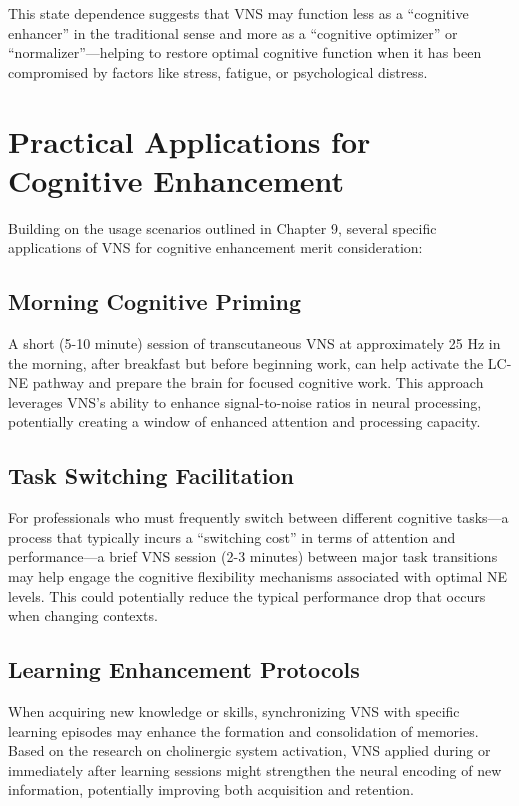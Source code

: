 \documentclass[
  Letterpaper,
]{scrbook}
\begin{document}
This state dependence suggests that VNS may function less as a
``cognitive enhancer'' in the traditional sense and more as a
``cognitive optimizer'' or ``normalizer''---helping to restore optimal
cognitive function when it has been compromised by factors like stress,
fatigue, or psychological distress.

\section{Practical Applications for Cognitive
Enhancement}\label{practical-applications-for-cognitive-enhancement}

Building on the usage scenarios outlined in Chapter 9, several specific
applications of VNS for cognitive enhancement merit consideration:

\subsection{Morning Cognitive Priming}\label{morning-cognitive-priming}

A short (5-10 minute) session of transcutaneous VNS at approximately 25
Hz in the morning, after breakfast but before beginning work, can help
activate the LC-NE pathway and prepare the brain for focused cognitive
work. This approach leverages VNS's ability to enhance signal-to-noise
ratios in neural processing, potentially creating a window of enhanced
attention and processing capacity.

\subsection{Task Switching
Facilitation}\label{task-switching-facilitation}

For professionals who must frequently switch between different cognitive
tasks---a process that typically incurs a ``switching cost'' in terms of
attention and performance---a brief VNS session (2-3 minutes) between
major task transitions may help engage the cognitive flexibility
mechanisms associated with optimal NE levels. This could potentially
reduce the typical performance drop that occurs when changing contexts.

\subsection{Learning Enhancement
Protocols}\label{learning-enhancement-protocols}

When acquiring new knowledge or skills, synchronizing VNS with specific
learning episodes may enhance the formation and consolidation of
memories. Based on the research on cholinergic system activation, VNS
applied during or immediately after learning sessions might strengthen
the neural encoding of new information, potentially improving both
acquisition and retention.
\end{document}
